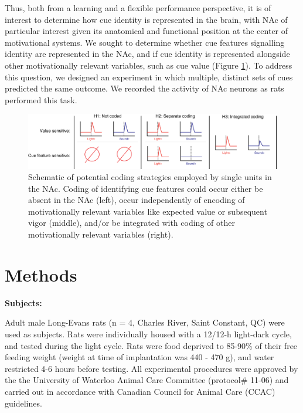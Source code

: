 \documentclass[11pt]{article}
\begin{document}
Thus, both from a learning and a flexible performance perspective, it is of interest to determine how cue identity is represented in the brain, with NAc of particular interest given its anatomical and functional position at the center of motivational systems. We sought to determine whether cue features signalling identity are represented in the NAc, and if cue identity is represented alongside other motivationally relevant variables, such as cue value (Figure \ref{fig:schematic}). To address this question, we designed an experiment in which multiple, distinct sets of cues predicted the same outcome. We recorded the activity of NAc neurons as rats performed this task. 

\begin{figure}[h]
\centering
\includegraphics[width=\textwidth]{Fig 1 - Schematic neural.png}
\caption{Schematic of potential coding strategies employed by single units in the NAc. Coding of identifying cue features could occur either be absent in the NAc (left), occur independently of encoding of motivationally relevant variables like expected value or subsequent vigor (middle), and/or be integrated with coding of other motivationally relevant variables (right).}
\label{fig:schematic}
\end{figure}

\section*{Methods}

{\bf Subjects:}

Adult male Long-Evans rats (n = 4, Charles River, Saint Constant, QC) were used as subjects. Rats were individually housed with a 12/12-h light-dark cycle, and tested during the light cycle. Rats were food deprived to 85-90\% of their free feeding weight (weight at time of implantation was 440 - 470 g), and water restricted 4-6 hours before testing. All experimental procedures were approved by the the University of Waterloo Animal Care Committee (protocol\# 11-06) and carried out in accordance with Canadian Council for Animal Care (CCAC) guidelines. 
\end{document}
